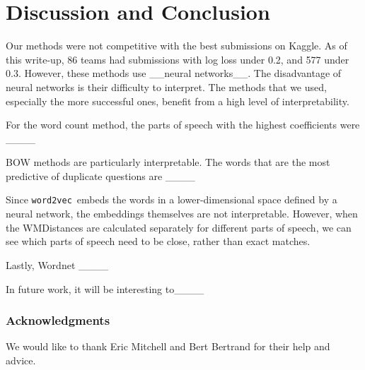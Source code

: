 \documentclass{article} %
\newcommand{\wordtvec}{\texttt{word2vec}}
\begin{document}
\section{Discussion and Conclusion}

Our methods were not competitive with the best submissions on Kaggle. As of this write-up, 86 teams had submissions with log loss under 0.2, and 577 under 0.3. However, these methods use \_\_neural networks\_\_. The disadvantage of neural networks is their difficulty to interpret. The methods that we used, especially the more successful ones, benefit from a high level of interpretability. 

For the word count method, the parts of speech with the highest coefficients were \_\_\_\_

BOW methods are particularly interpretable. The words that are the most predictive of duplicate questions are \_\_\_\_

Since \wordtvec\ embeds the words in a lower-dimensional space defined by a neural network, the embeddings themselves are not interpretable. However, when the WMDistances are calculated separately for different parts of speech, we can see which parts of speech need to be close, rather than exact matches.

Lastly, Wordnet \_\_\_\_

In future work, it will be interesting to\_\_\_\_

\subsubsection*{Acknowledgments}

We would like to thank Eric Mitchell and Bert Bertrand for their help and advice.

\printbibliography
\end{document}

